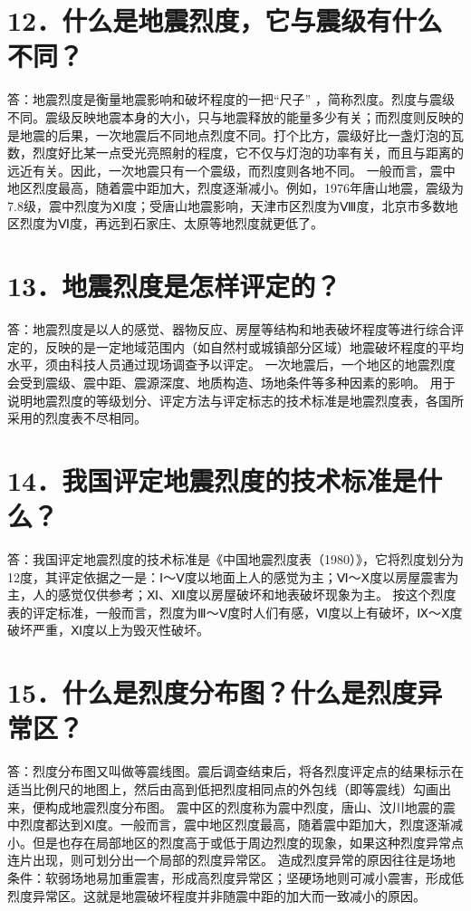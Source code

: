 \documentclass[a4paper,12pt,english]{sphinxmanual}
\begin{document}
\section{12．什么是地震烈度，它与震级有什么不同？}
\label{\detokenize{index:id14}}
答：地震烈度是衡量地震影响和破坏程度的一把“尺子” ，简称烈度。烈度与震级不同。震级反映地震本身的大小，只与地震释放的能量多少有关；而烈度则反映的是地震的后果，一次地震后不同地点烈度不同。打个比方，震级好比一盏灯泡的瓦数，烈度好比某一点受光亮照射的程度，它不仅与灯泡的功率有关，而且与距离的远近有关。因此，一次地震只有一个震级，而烈度则各地不同。
一般而言，震中地区烈度最高，随着震中距加大，烈度逐渐减小。例如，1976年唐山地震，震级为7.8级，震中烈度为Ⅺ度；受唐山地震影响，天津市区烈度为Ⅷ度，北京市多数地区烈度为Ⅵ度，再远到石家庄、太原等地烈度就更低了。


\section{13．地震烈度是怎样评定的？}
\label{\detokenize{index:id15}}
答：地震烈度是以人的感觉、器物反应、房屋等结构和地表破坏程度等进行综合评定的，反映的是一定地域范围内（如自然村或城镇部分区域）地震破坏程度的平均水平，须由科技人员通过现场调查予以评定。
一次地震后，一个地区的地震烈度会受到震级、震中距、震源深度、地质构造、场地条件等多种因素的影响。
用于说明地震烈度的等级划分、评定方法与评定标志的技术标准是地震烈度表，各国所采用的烈度表不尽相同。


\section{14．我国评定地震烈度的技术标准是什么？}
\label{\detokenize{index:id16}}
答：我国评定地震烈度的技术标准是《中国地震烈度表（1980）》，它将烈度划分为12度，其评定依据之一是：Ⅰ～Ⅴ度以地面上人的感觉为主；Ⅵ～Ⅹ度以房屋震害为主，人的感觉仅供参考；Ⅺ、Ⅻ度以房屋破坏和地表破坏现象为主。
按这个烈度表的评定标准，一般而言，烈度为Ⅲ～Ⅴ度时人们有感，Ⅵ度以上有破坏，Ⅸ～Ⅹ度破坏严重，Ⅺ度以上为毁灭性破坏。


\section{15．什么是烈度分布图？什么是烈度异常区？}
\label{\detokenize{index:id17}}
答：烈度分布图又叫做等震线图。震后调查结束后，将各烈度评定点的结果标示在适当比例尺的地图上，然后由高到低把烈度相同点的外包线（即等震线）勾画出来，便构成地震烈度分布图。
震中区的烈度称为震中烈度，唐山、汶川地震的震中烈度都达到Ⅺ度。一般而言，震中地区烈度最高，随着震中距加大，烈度逐渐减小。但是也存在局部地区的烈度高于或低于周边烈度的现象，如果这种烈度异常点连片出现，则可划分出一个局部的烈度异常区。
造成烈度异常的原因往往是场地条件：软弱场地易加重震害，形成高烈度异常区；坚硬场地则可减小震害，形成低烈度异常区。这就是地震破坏程度并非随震中距的加大而一致减小的原因。
\end{document}
